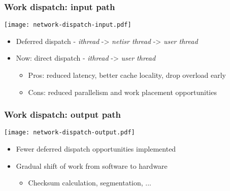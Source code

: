 \begin{frame}
  \frametitle{Work dispatch: input path}

  \begin{center}
    \texttt{[image: network-dispatch-input.pdf]}
  \end{center}

  \begin{small}
  \begin{itemize}
    \pause
    \item Deferred dispatch - \textit{ithread} -> \textit{netisr thread} ->
      \textit{user thread}

    \pause

    \item Now: direct dispatch - \textit{ithread} -> \textit{user thread}
    \begin{itemize}
      \item Pros: reduced latency, better cache locality, drop overload early
      \item Cons: reduced parallelism and work placement opportunities
    \end{itemize}
  \end{itemize}
  \end{small}
\end{frame}

\begin{frame}
  \frametitle{Work dispatch: output path}

  \begin{center}
    \texttt{[image: network-dispatch-output.pdf]}
  \end{center}

  \pause

  \begin{itemize}
    \item Fewer deferred dispatch opportunities implemented

    \pause

    \item Gradual shift of work from software to hardware
    \begin{itemize}
      \item Checksum calculation, segmentation, ...
    \end{itemize}
  \end{itemize}

\end{frame}

